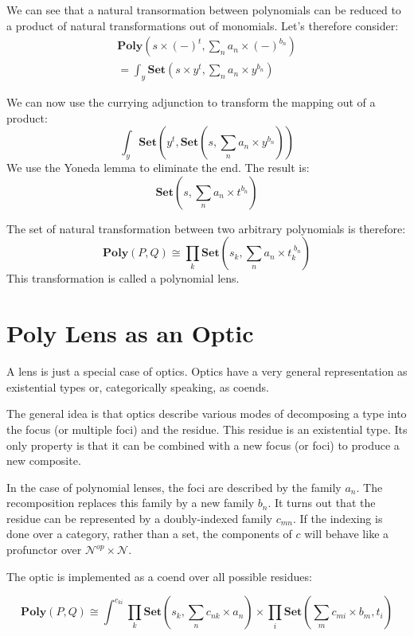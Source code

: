 \documentclass[11pt]{amsart}
\begin{document}
We can see that a natural transormation between polynomials can be reduced to a product of natural transformations out of monomials. Let's therefore consider:
\begin{align*}
 \mathbf{Poly}\left(s \times (-)^t, \sum_n a_n \times (-)^{b_n}\right) 
 \\
 = \int_y \mathbf{Set} \left( s \times y^t, \sum_n a_n \times y^{b_n}\right)
 \end{align*}
 
 We can now use the currying adjunction to transform the mapping out of a product:
\[ \int_y \mathbf{Set} \left( 
    y^t,  \mathbf{Set}\left(s, \sum_n a_n \times y^{b_n} \right)  \right) \]
 We use the Yoneda lemma to eliminate the end. The result is:
 \[ \mathbf{Set}\left(s, \sum_n a_n \times t^{b_n} \right) \]
 
The set of natural transformation between two arbitrary polynomials is therefore:
 \[ \mathbf{Poly}(P, Q) \cong \prod_k \mathbf{Set}\left(s_k, \sum_n a_n \times t_{k}^{\;b_n} \right) \]
This transformation is called a polynomial lens.

\section{Poly Lens as an Optic}

A lens is just a special case of optics. Optics have a very general representation as existential types or, categorically speaking, as coends. 

The general idea is that optics describe various modes of decomposing a type into the focus (or multiple foci) and the residue. This residue is an existential type. Its only property is that it can be combined with a new focus (or foci) to produce a new composite.

In the case of polynomial lenses, the foci are described by the family $a_n$. The recomposition replaces this family by a new family $b_n$. It turns out that the residue can be represented by a doubly-indexed family $c_{m n}$. If the indexing is done over a category, rather than a set, the components of $c$ will behave like a profunctor over $\mathcal{N}^{op} \times \mathcal{N}$.

The optic is implemented as a coend over all possible residues:

\[ \mathbf{Poly}(P, Q) \cong \int^{c_{k i}}  \prod_k \mathbf{Set} \left(s_k, \sum_n c_{n k} \times a_n\right) \times \prod_i  \mathbf{Set} \left(\sum_m c_{m i} \times b_m, t_i \right) \]
\end{document}
